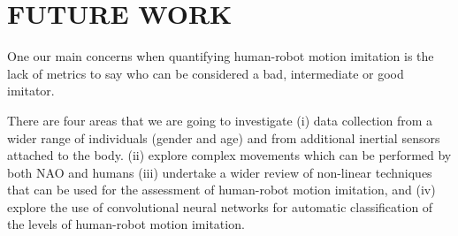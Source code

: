 \documentclass{sig-alternate-05-2015}
\begin{document}
\section{FUTURE WORK}
One our main concerns when quantifying human-robot motion imitation
is the lack of metrics to say who can be considered a bad, intermediate or good imitator.

There are four areas that we are going to investigate
(i) data collection from a wider range of individuals (gender and age)
and from additional inertial sensors attached to the body.
(ii) explore complex movements which can be performed by both NAO and humans
(iii) undertake a wider review of non-linear techniques that can be used for 
the assessment of human-robot motion imitation, and
(iv) explore the use of convolutional neural networks for automatic 
classification of the levels of human-robot motion imitation.






%
%
\end{document}
